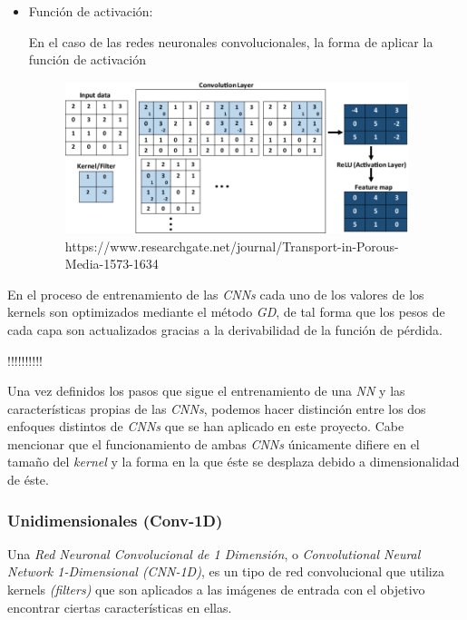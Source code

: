 \begin{itemize}
                \item Función de activación:


                    En el caso de las redes neuronales convolucionales, la forma de aplicar la función de activación 



                    \begin{figure}[h]
                        \centering
                        \includegraphics[width=10cm]{archivos/CNN/CNNRELUImage}
                        \caption{https://www.researchgate.net/journal/Transport-in-Porous-Media-1573-1634}
                        \label{CNNRELUImage}
                     \end{figure}

            \end{itemize}

            En el proceso de entrenamiento de las \textit{CNNs} cada uno de los valores de los kernels son optimizados mediante el método \textit{GD}, de tal forma que los pesos de cada capa son actualizados gracias a la derivabilidad de la función de pérdida.

            !!!!!\cite{KL-Divergence}!!!!!

            Una vez definidos los pasos que sigue el entrenamiento de una \textit{NN} y las características propias de las \textit{CNNs}, podemos hacer distinción entre los dos enfoques distintos de \textit{CNNs} que se han aplicado en este proyecto. Cabe mencionar que el funcionamiento de ambas \textit{CNNs} únicamente difiere en el tamaño del \textit{kernel} y la forma en la que éste se desplaza debido a dimensionalidad de éste.


            \subsubsection{Unidimensionales (Conv-1D)}
            
                Una \textit{Red Neuronal Convolucional de 1 Dimensión}, o \textit{Convolutional Neural Network 1-Dimensional (CNN-1D)}, es un tipo de red convolucional que utiliza kernels \textit{(filters)} que son aplicados a las imágenes de entrada con el objetivo encontrar ciertas características en ellas.\\

